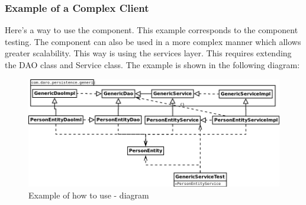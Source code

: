 \documentclass[a4paper,11pt]{book}
\begin{document}
\pagebreak
\subsubsection{Example of a Complex Client}
Here's a way to use the component. This example corresponds to the component testing.
The component can also be used in a more complex manner which allows greater scalability. 
This way is using the services layer. This requires extending the DAO class and Service class.
The example is shown in the following diagram:

\begin{figure}[h] %
  \includegraphics[width=\textwidth]{generic_persistence_class_diagram_to_use}
  \caption{Example of how to use - diagram}
  \centering
  \label{fig:generic_persistence_class_diagram_to_use} %
\end{figure}
\end{document}
